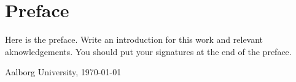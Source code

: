 \chapter*{Preface}\label{ch:preface}
Here is the preface. Write an introduction for this work and  relevant aknowledgements. You should put your signatures at the end of the preface.

\vspace{\baselineskip}\hfill Aalborg University, \today
\vfill\noindent
\begin{center}%
\hfill
{}
\vspace{3\baselineskip}
\newline
\end{center}